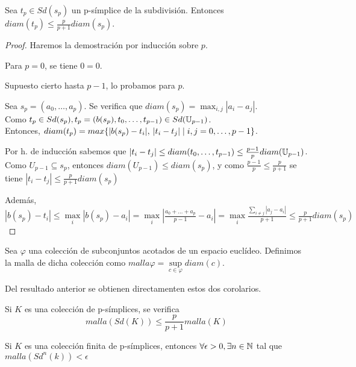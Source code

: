 \begin{proposition}
  Sea $t_p \in Sd(s_p)$ un p-símplice de la subdivisión. Entonces $diam(t_p) \leq \frac{p}{p+1} diam(s_p)$.
\end{proposition}

\begin{proof}
  Haremos la demostración por inducción sobre $p$.

  Para $p = 0$, se tiene $0 = 0$.

  Supuesto cierto hasta $p-1$, lo probamos para $p$.

  Sea $s_p = (a_0, \dots, a_p)$. Se verifica que $diam(s_p) = \max_{i,j} |a_i - a_j|$. \\
  Como $t_p \in Sd(s_p), t_p = (b(s_p), t_0, \dots, t_{p-1}) \in Sd({\mathbb U}_{p-1})$. \\
  Entonces, $diam(t_p) = max\{|b(s_p) - t_i|,\hspace{0.2em} |t_i - t_j| \mid i,j = 0, \dots, p-1\}$.

  Por h. de inducción sabemos que $|t_i - t_j| \leq diam(t_0, \dots, t_{p-1}) \leq \frac{p-1}{p} diam({\mathbb U}_{p-1})$.
  Como $U_{p-1} \subseteq s_p$, entonces $diam(U_{p-1}) \leq diam(s_p)$, y como $\frac{p-1}{p} \leq \frac{p}{p+1}$
  se tiene $|t_i - t_j| \leq \frac{p}{p+1} diam(s_p)$

  Además, $|b(s_p) - t_i| \leq \max\limits_i |b(s_p) - a_i| = \max\limits_i |\frac{a_0 + \dots + a_p}{p-1} - a_i| =
  \max\limits_i \frac{\sum\limits_{i \neq j} |a_j - a_i|}{p+1} \leq \frac{p}{p+1} diam(s_p)$
\end{proof}

\begin{definition}
  Sea $\varphi$ una colección de subconjuntos acotados de un espacio euclídeo. Definimos la malla de
  dicha colección como $malla \varphi = \sup\limits_{c \in \varphi} diam(c)$.
\end{definition}

Del resultado anterior se obtienen directamenten estos dos corolarios.

\begin{corollary}
  Si $K$ es una colección de p-símplices, se verifica \[malla(Sd(K)) \leq \frac{p}{p+1} malla(K) \]
\end{corollary}

\begin{corollary}
  Si $K$ es una colección finita de p-símplices, entonces $\forall \epsilon > 0, \exists n \in {\mathbb N}$ tal que \\$malla(Sd^n(k)) < \epsilon$
\end{corollary}


